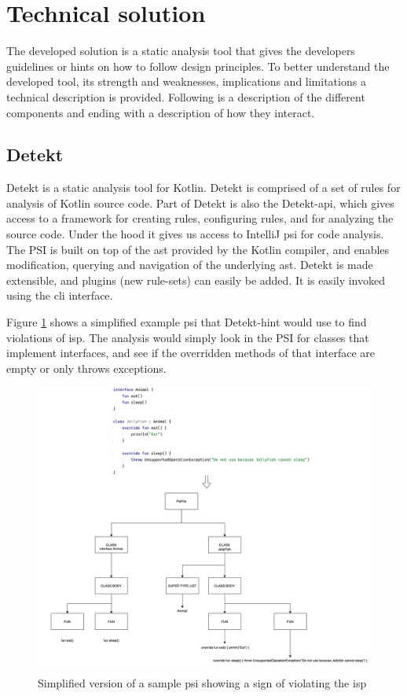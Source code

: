 \documentclass[pdftex,10pt,b5paper,twoside]{report}
\begin{document}
\section{Technical solution}
\label{technical-solution}

The developed solution is a static analysis tool that gives the developers guidelines or hints on how to follow design principles. To better understand the developed tool, its strength and weaknesses, implications and limitations a technical description is provided. Following is a description of the different components and ending with a description of how they interact.

\subsection{Detekt}
Detekt is a static analysis tool for Kotlin. Detekt is comprised of a set of rules for analysis of Kotlin source code. Part of Detekt is also the Detekt-api, which gives access to a framework for creating rules, configuring rules, and for analyzing the source code. Under the hood it gives us access to IntelliJ \gls{psi} for code analysis. The PSI is built on top of the \gls{ast} provided by the Kotlin compiler, and enables modification, querying and navigation of the underlying \gls{ast}. Detekt is made extensible, and plugins (new rule-sets) can easily be added. It is easily invoked using the \gls{cli} interface.

Figure \ref{fig:psi} shows a simplified example \gls{psi} that Detekt-hint would use to find violations of \gls{isp}. The analysis would simply look in the PSI for classes that implement interfaces, and see if the overridden methods of that interface are empty or only throws exceptions. 

\begin{figure}[h!]
    \centering
    \includegraphics[width=\linewidth]{report/images/psi.png}
    \caption{Simplified version of a sample \gls{psi} showing a sign of violating the \gls{isp}}
    \label{fig:psi}
\end{figure}
\end{document}
